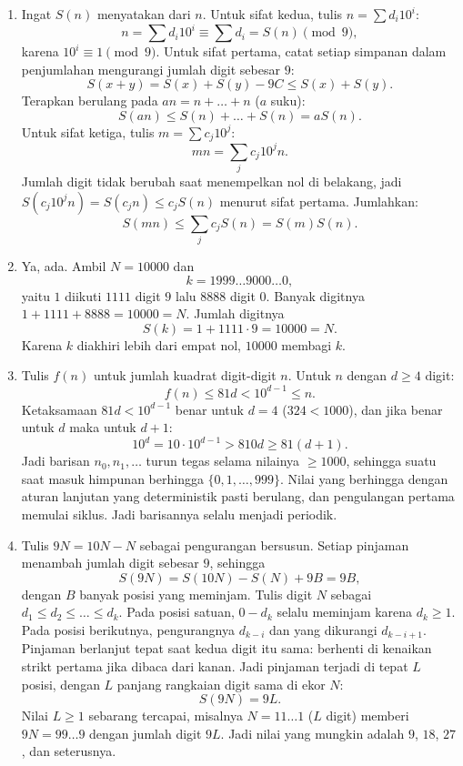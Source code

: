 \documentclass[12pt]{scrartcl}
\begin{document}
\begin{enumerate}[resume]
	\item Ingat $S(n)$ menyatakan  dari $n$.
	Untuk sifat kedua, tulis $n = \sum d_i10^i$:
	\[ n = \sum d_i10^i \equiv \sum d_i = S(n) \pmod{9}, \]
	karena $10^i \equiv 1 \pmod{9}$.
	Untuk sifat pertama, catat setiap simpanan dalam penjumlahan
	mengurangi jumlah digit sebesar $9$:
	\[ S(x + y) = S(x) + S(y) - 9C \le S(x) + S(y). \]
	Terapkan berulang pada $an = n + \dots + n$ ($a$ suku):
	\[ S(an) \le S(n) + \dots + S(n) = aS(n). \]
	Untuk sifat ketiga, tulis $m = \sum c_j10^j$:
	\[ mn = \sum_j c_j10^jn. \]
	Jumlah digit tidak berubah saat menempelkan nol di belakang,
	jadi $S(c_j10^jn) = S(c_jn) \le c_jS(n)$ menurut sifat pertama.
	Jumlahkan:
	\[ S(mn) \le \sum_j c_jS(n) = S(m)S(n). \]

	\item Ya, ada. Ambil $N = 10000$ dan
	\[ k = 1999\dots9000\dots0, \]
	yaitu $1$ diikuti $1111$ digit $9$ lalu $8888$ digit $0$.
	Banyak digitnya $1 + 1111 + 8888 = 10000 = N$.
	Jumlah digitnya
	\[ S(k) = 1 + 1111 \cdot 9 = 10000 = N. \]
	Karena $k$ diakhiri lebih dari empat nol, $10000$ membagi $k$.

	\item Tulis $f(n)$ untuk jumlah kuadrat digit-digit $n$.
	Untuk $n$ dengan $d \ge 4$ digit:
	\[ f(n) \le 81d < 10^{d-1} \le n. \]
	Ketaksamaan $81d < 10^{d-1}$ benar untuk $d = 4$ ($324 < 1000$),
	dan jika benar untuk $d$ maka untuk $d + 1$:
	\[ 10^d = 10 \cdot 10^{d-1} > 810d \ge 81(d + 1). \]
	Jadi barisan $n_0, n_1, \dots$ turun tegas selama nilainya $\ge 1000$,
	sehingga suatu saat masuk himpunan berhingga $\{0, 1, \dots, 999\}$.
	Nilai yang berhingga dengan aturan lanjutan yang deterministik
	pasti berulang, dan pengulangan pertama memulai siklus.
	Jadi barisannya selalu menjadi periodik.

	\item Tulis $9N = 10N - N$ sebagai pengurangan bersusun.
	Setiap pinjaman menambah jumlah digit sebesar $9$, sehingga
	\[ S(9N) = S(10N) - S(N) + 9B = 9B, \]
	dengan $B$ banyak posisi yang meminjam.
	Tulis digit $N$ sebagai $d_1 \le d_2 \le \dots \le d_k$.
	Pada posisi satuan, $0 - d_k$ selalu meminjam karena $d_k \ge 1$.
	Pada posisi berikutnya, pengurangnya $d_{k-i}$ dan yang dikurangi $d_{k-i+1}$.
	Pinjaman berlanjut tepat saat kedua digit itu sama:
	berhenti di kenaikan strikt pertama jika dibaca dari kanan.
	Jadi pinjaman terjadi di tepat $L$ posisi, dengan $L$ panjang
	rangkaian digit sama di ekor $N$:
	\[ S(9N) = 9L. \]
	Nilai $L \ge 1$ sebarang tercapai, misalnya $N = 11\dots1$ ($L$ digit)
	memberi $9N = 99\dots9$ dengan jumlah digit $9L$.
	Jadi nilai yang mungkin adalah $9$, $18$, $27$, dan seterusnya.


\end{enumerate}
\end{document}
